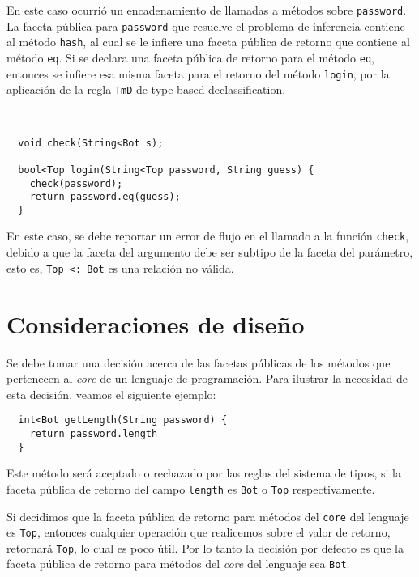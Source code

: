 En este caso ocurrió un encadenamiento de llamadas a métodos sobre \texttt{password}. La faceta pública para \texttt{password} que resuelve el problema de inferencia contiene al método \texttt{hash}, al cual se le infiere una faceta pública de retorno que contiene al método \texttt{eq}. Si se declara una faceta pública de retorno para el método \texttt{eq}, entonces se infiere esa misma faceta para el retorno del método \texttt{login}, por la aplicación de la regla \texttt{TmD} de type-based declassification.

\begin{ej} \ \\
  \normalfont
\begin{lstlisting}
  void check(String<Bot s);

  bool<Top login(String<Top password, String guess) {
    check(password);
    return password.eq(guess);
  }
\end{lstlisting}
\end{ej}

En este caso, se debe reportar un error de flujo en el llamado a la función \texttt{check}, debido a que la faceta del argumento debe ser subtipo de la faceta del parámetro, esto es, \texttt{Top <: Bot} es una relación no válida.

\section{Consideraciones de diseño}

Se debe tomar una decisión acerca de las facetas públicas de los métodos que pertenecen al \textit{core} de un lenguaje de programación. Para ilustrar la necesidad de esta decisión, veamos el siguiente ejemplo:

\begin{lstlisting}
  int<Bot getLength(String password) {
    return password.length
  }
\end{lstlisting}

Este método será aceptado o rechazado por las reglas del sistema de tipos, si la faceta pública de retorno del campo \texttt{length} es \texttt{Bot} o \texttt{Top} respectivamente.

Si decidimos que la faceta pública de retorno para métodos del \texttt{core} del lenguaje es \texttt{Top}, entonces cualquier operación que realicemos sobre el valor de retorno, retornará \texttt{Top}, lo cual es poco útil. Por lo tanto la decisión por defecto es que la faceta pública de retorno para métodos del \textit{core} del lenguaje sea \texttt{Bot}.

